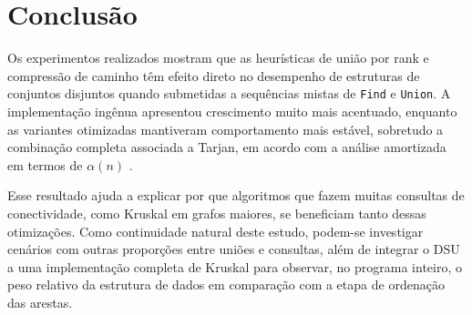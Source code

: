 \section{Conclusão}
\label{sec:conclusao}

Os experimentos realizados mostram que as heurísticas de união por rank e compressão de caminho têm efeito direto no desempenho de estruturas de conjuntos disjuntos quando submetidas a sequências mistas de \texttt{Find} e \texttt{Union}. A implementação ingênua apresentou crescimento muito mais acentuado, enquanto as variantes otimizadas mantiveram comportamento mais estável, sobretudo a combinação completa associada a Tarjan, em acordo com a análise amortizada em termos de $\alpha(n)$ \cite{tarjan1975efficiency}.

Esse resultado ajuda a explicar por que algoritmos que fazem muitas consultas de conectividade, como Kruskal em grafos maiores, se beneficiam tanto dessas otimizações. Como continuidade natural deste estudo, podem-se investigar cenários com outras proporções entre uniões e consultas, além de integrar o DSU a uma implementação completa de Kruskal para observar, no programa inteiro, o peso relativo da estrutura de dados em comparação com a etapa de ordenação das arestas.
